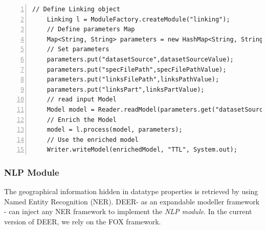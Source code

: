 \documentclass[a4paper,twoside,bibtotoc,abstracton,12pt,BCOR=15mm]{article}
\newcommand{\geolift}{\textsc{DEER}\xspace}
\begin{document}
    
    
    \begingroup
	\fontsize{8pt}{10pt}\selectfont
    \begin{lstlisting}[label=lst:Linking, float=tp, numbers=left, numberstyle=\tiny, caption = Code fragment to call the \texttt{Linking} class.]
    // Define Linking object
    Linking l = ModuleFactory.createModule("linking");
    // Define parameters Map
    Map<String, String> parameters = new HashMap<String, String>();
    // Set parameters
    parameters.put("datasetSource",datasetSourceValue);
    parameters.put("specFilePath",specFilePathValue);
    parameters.put("linksFilePath",linksPathValue);
    parameters.put("linksPart",linksPartValue);
    // read input Model
    Model model = Reader.readModel(parameters.get("datasetSource"));
    // Enrich the Model
    model = l.process(model, parameters);
    // Use the enriched model
    Writer.writeModel(enrichedModel, "TTL", System.out);
    \end{lstlisting}
    \endgroup

    \subsubsection{NLP Module}
	The geographical information hidden in datatype properties is retrieved by using Named Entity Recognition (NER).
	\geolift - as an expandable modeller framework - can inject any NER framework to implement the \emph{NLP module}.
	In the current version of \geolift, we rely on the FOX framework. 
\end{document}
